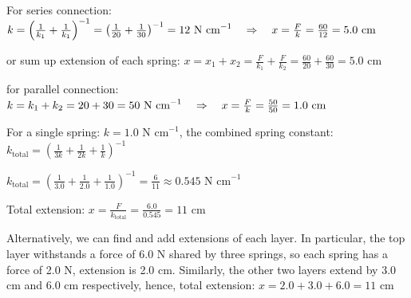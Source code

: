 \begin{soln} For series connection: $k = \left(\frac{1}{k_1} + \frac{1}{k_1}\right)^{-1} = \left( \frac{1}{20} + \frac{1}{30} \right)^{-1} = 12 \text{ N cm}^{-1} \quad \Rightarrow \quad x = \frac{F}{k} = \frac{60}{12} = 5.0 \text{ cm}$

\eqskip or sum up extension of each spring: $x = x_1 + x_2 = \frac{F}{k_1} + \frac{F}{k_2} = \frac{60}{20} + \frac{60}{30} = 5.0 \text{ cm}$

for parallel connection: $k = k_1 + k_2 = 20 + 30 = 50 \text{ N cm}^{-1} \quad \Rightarrow \quad x = \frac{F}{k} = \frac{50}{50} = 1.0 \text{ cm} $ \eoe
\end{soln}
\begin{marginfigure}
	\vspace*{-5pt}
	\centering
	\vspace*{-16pt}
\end{marginfigure}



\begin{soln} For a single spring: $k = 1.0 \text{ N cm}^{-1}$, the combined spring constant: $k_\text{total} = \left( \frac{1}{3k} + \frac{1}{2k} + \frac{1}{k} \right)^{-1}$

{
	\centering
	
	\eqyskip $ k_\text{total} = \left(\frac{1}{3.0} + \frac{1}{2.0} + \frac{1}{1.0} \right)^{-1} = \frac{6}{11} \approx 0.545 \text{ N cm}^{-1}$
	
}

Total extension: $x = \frac{F}{k_\text{total}} = \frac{6.0}{0.545} = 11 \text{ cm}$

Alternatively, we can find and add extensions of each layer. In particular, the top layer withstands a force of 6.0 N shared by three springs, so each spring has a force of 2.0 N, extension is 2.0 cm. Similarly, the other two layers extend by 3.0 cm and 6.0 cm respectively, hence, total extension: $x = 2.0 + 3.0 + 6.0 = 11 \text{ cm}$ \end{soln}

